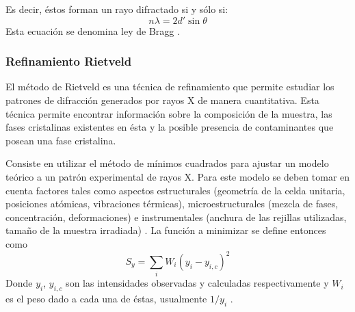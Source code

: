 \documentclass[../main.tex]{subfiles}
\begin{document}
Es decir, éstos forman un rayo difractado si y sólo si:
\begin{equation}
    n\lambda=2d'\sin{\theta}
    \label{eq:leydebragg}
\end{equation}
Esta ecuación se denomina ley de Bragg \cite{Cullity2014}.
\subsubsection{Refinamiento Rietveld}
El método de Rietveld es una técnica de refinamiento que permite estudiar los patrones de difracción generados por rayos X de manera cuantitativa. Esta técnica permite encontrar información sobre la composición de la muestra, las fases cristalinas existentes en ésta y la posible presencia de contaminantes que posean una fase cristalina.

Consiste en utilizar el método de mínimos cuadrados para ajustar un modelo teórico a un patrón experimental de rayos X. Para este modelo se deben tomar en cuenta factores tales como aspectos estructurales (geometría de la celda unitaria, posiciones atómicas, vibraciones térmicas), microestructurales (mezcla de fases, concentración, deformaciones) e instrumentales (anchura de las rejillas utilizadas, tamaño de la muestra irradiada) \cite{Rietveld}. La función a minimizar se define entonces como
\begin{equation}
    S_y=\sum_i W_i\left(y_{i}-y_{i,c}\right)^2
    \label{eq:minimcuad}
\end{equation}
Donde $y_{i}$, $y_{i,c}$ son las intensidades observadas y calculadas respectivamente y $W_i$ es el peso dado a cada una de éstas, usualmente $1/y_i$ \cite{Fuentes2004}.
\end{document}
